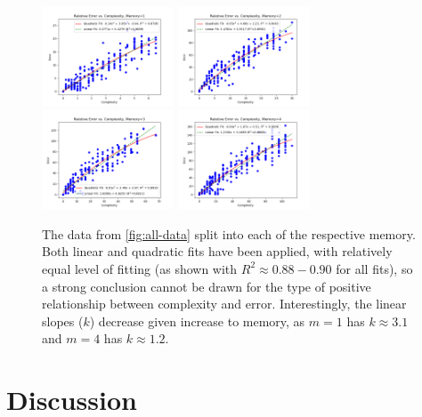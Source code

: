 \documentclass[12pt]{article}
\begin{document}
\begin{figure}[H]
    \centering
    \includegraphics[width=0.35\textwidth]{images/graph-mem1.png}
    \includegraphics[width=0.35\textwidth]{images/graph-mem2.png}
    \includegraphics[width=0.35\textwidth]{images/graph-mem3.png}
    \includegraphics[width=0.35\textwidth]{images/graph-mem4.png}
    \caption{The data from \ref{fig:all-data} split into each of the respective memory. Both linear and quadratic fits have been applied, with relatively equal level of fitting (as shown with $R^{2} \approx 0.88-0.90$ for all fits), so a strong conclusion cannot be drawn for the type of positive relationship between complexity and error. Interestingly, the linear slopes ($k$) decrease given increase to memory, as $m=1$ has $k \approx 3.1$ and $m=4$ has $k \approx 1.2$.}
    \label{fig:data-split}
\end{figure}

\section{Discussion}
\end{document}
